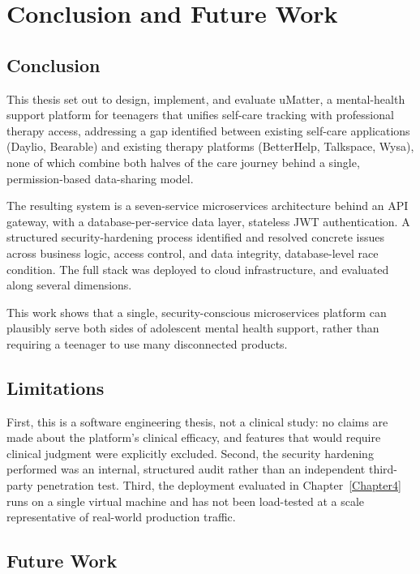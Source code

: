 \chapter{Conclusion and Future Work}
\label{Chapter5}

\section{Conclusion}

This thesis set out to design, implement, and evaluate uMatter, a mental-health support platform for teenagers that unifies self-care tracking with professional therapy access, addressing a gap identified between existing self-care applications (Daylio, Bearable) and existing therapy platforms (BetterHelp, Talkspace, Wysa), none of which combine both halves of the care journey behind a single, permission-based data-sharing model.

The resulting system is a seven-service microservices architecture behind an API gateway, with a database-per-service data layer, stateless JWT authentication. A structured security-hardening process identified and resolved concrete issues across business logic, access control, and data integrity, database-level race condition. The full stack was deployed to cloud infrastructure, and evaluated along several dimensions.

This work shows that a single, security-conscious microservices platform can plausibly serve both sides of adolescent mental health support, rather than requiring a teenager to use many disconnected products.

\section{Limitations}

First, this is a software engineering thesis, not a clinical study: no claims are made about the platform's clinical efficacy, and features that would require clinical judgment were explicitly excluded. Second, the security hardening performed was an internal, structured audit rather than an independent third-party penetration test. Third, the deployment evaluated in Chapter~\ref{Chapter4} runs on a single virtual machine and has not been load-tested at a scale representative of real-world production traffic.

\section{Future Work}

